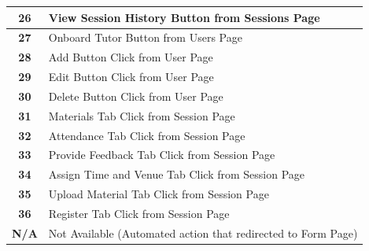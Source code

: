 \begin{justify}
\begin{table}[H]
\begin{tabular}{|c|l|}
        \hline
        \textbf{ 26 }                                       & View Session
          History Button from Sessions Page                 \\
        \hline
        \textbf{ 27 }                                       & Onboard Tutor
          Button from Users Page                           \\
        \hline
        \textbf{ 28 }                                       & Add Button
          Click from User Page                                \\
        \hline
        \textbf{ 29 }                                       & Edit Button
          Click from User Page                               \\
        \hline
        \textbf{ 30 }                                       & Delete Button
          Click from User Page                             \\
        \hline
        \textbf{ 31 }                                       & Materials Tab
          Click from Session Page                          \\
        \hline
        \textbf{ 32 }                                       & Attendance
          Tab Click from Session Page                         \\
        \hline
        \textbf{ 33 }                                       & Provide
          Feedback Tab Click from Session Page                   \\
        \hline
        \textbf{ 34 }                                       & Assign Time
          and Venue Tab Click from Session Page              \\
        \hline
        \textbf{ 35 }                                       & Upload
          Material Tab Click from Session Page                    \\
        \hline
        \textbf{ 36 }                                       & Register Tab Click
          from Session Page                           \\
        \hline
        \textbf{ N/A }                                      & Not Available
          (Automated action that redirected to Form Page)  \\
        \hline
        \end{tabular}
        \label{FSMTable}
    \end{table}

\end{justify}

